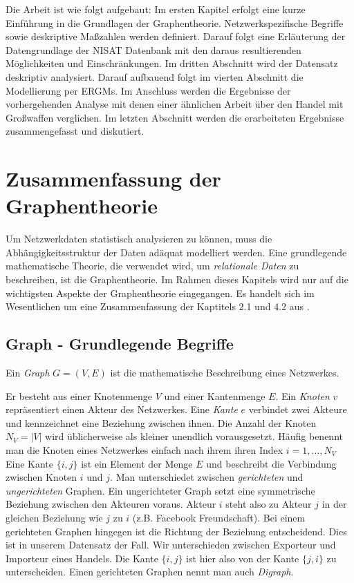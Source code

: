 \documentclass[a4paper,ngerman,oneside,titlepage,bibliography=totoc,11pt]{scrreprt}
\begin{document}
Die Arbeit ist wie folgt aufgebaut: Im ersten Kapitel erfolgt eine kurze Einführung in die Grundlagen  der Graphentheorie. Netzwerkspezifische Begriffe sowie deskriptive Maßzahlen werden definiert. Darauf folgt eine Erläuterung der Datengrundlage der NISAT Datenbank mit den daraus resultierenden Möglichkeiten und Einschränkungen. Im dritten Abschnitt wird der Datensatz deskriptiv analysiert. Darauf aufbauend folgt im vierten Abschnitt die Modellierung per ERGMs. Im Anschluss werden die Ergebnisse der vorhergehenden Analyse mit denen einer ähnlichen Arbeit über den Handel mit Großwaffen verglichen. Im letzten Abschnitt werden die erarbeiteten Ergebnisse zusammengefasst und diskutiert.





\chapter{Zusammenfassung der Graphentheorie}

Um Netzwerkdaten statistisch analysieren zu können, muss die Abhängigkeitsstruktur der Daten adäquat modelliert werden. Eine grundlegende mathematische Theorie, die verwendet wird, um \emph{relationale Daten} zu beschreiben, ist die Graphentheorie. Im Rahmen dieses Kapitels wird nur auf die wichtigsten Aspekte der Graphentheorie eingegangen. Es handelt sich im Wesentlichen um eine Zusammenfassung der Kaptitels 2.1 und 4.2 aus \citet{kol09}.

\section{Graph - Grundlegende Begriffe}

Ein \emph{Graph} $G = (V,E)$ ist die mathematische Beschreibung eines Netzwerkes. 

Er besteht aus einer Knotenmenge $V$ und einer Kantenmenge $E$. Ein \emph{Knoten} $v$ repräsentiert einen Akteur des Netzwerkes. Eine \emph{Kante} $e$ verbindet zwei Akteure und kennzeichnet eine Beziehung zwischen ihnen.
Die Anzahl der Knoten $N_V = |V|$ wird üblicherweise als kleiner unendlich vorausgesetzt. Häufig benennt man die Knoten eines Netzwerkes einfach nach ihrem ihren Index $i = 1, ..., N_V$
Eine Kante $\{i,j\}$ ist ein Element der Menge $E$ und  beschreibt die Verbindung zwischen Knoten $i$ und $j$. 
Man unterschiedet zwischen \emph{gerichteten} und \emph{ungerichteten} Graphen. Ein ungerichteter Graph setzt eine symmetrische Beziehung zwischen den Akteuren voraus. Akteur $i$ steht also zu Akteur $j$ in der gleichen Beziehung wie $j$ zu $i$ (z.B. Facebook Freundschaft). Bei einem gerichteten Graphen hingegen ist die Richtung der Beziehung entscheidend. Dies ist in unserem Datensatz der Fall. Wir unterschieden zwischen Exporteur und Importeur eines Handels. Die Kante $\{i,j\}$ ist hier also von der Kante $\{j,i\}$ zu unterscheiden. Einen gerichteten Graphen nennt man auch \emph{Digraph}.
\end{document}
